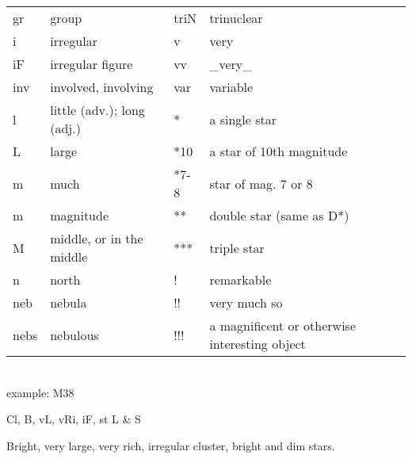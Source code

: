 \begin{tabular}{ll|ll}
gr     & group                      & triN     & trinuclear                                    \\
i      & irregular                  & v        & very                                          \\
iF     & irregular figure           & vv       & \_very\_                                      \\
inv    & involved, involving        & var      & variable                                      \\
l      & little (adv.); long (adj.) & *        & a single star                                 \\
L      & large                      & *10      & a star of 10th magnitude                      \\
m      & much                       & *7-8     & star of mag. 7 or 8                           \\
m      & magnitude                  & **       & double star (same as D*)                      \\
M      & middle, or in the middle   & ***      & triple star                                   \\
n      & north                      & !        & remarkable                                    \\
neb    & nebula                     & !!       & very much so                                  \\
nebs   & nebulous                   & !!!      & a magnificent or otherwise interesting object
\end{tabular}
\ \\[2ex]

example: M38

Cl, B, vL, vRi, iF, st L \& S

Bright, very large, very rich, irregular cluster, bright and dim stars.
